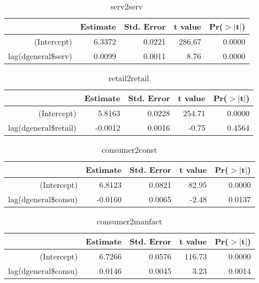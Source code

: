 \documentclass[12pt,a4paper]{report}
\begin{document}
	\begin{table}[ht]
		\centering
		\begin{tabular}{rrrrr}
			\hline
			& Estimate & Std. Error & t value & Pr($>$$|$t$|$) \\ 
			\hline
			(Intercept) & 6.3372 & 0.0221 & 286.67 & 0.0000 \\ 
			lag(dgeneral\$serv) & 0.0099 & 0.0011 & 8.76 & 0.0000 \\ 
			\hline
		\end{tabular}
		\caption{serv2serv} 
	\end{table}
	
	\begin{table}[ht]
		\centering
		\begin{tabular}{rrrrr}
			\hline
			& Estimate & Std. Error & t value & Pr($>$$|$t$|$) \\ 
			\hline
			(Intercept) & 5.8163 & 0.0228 & 254.71 & 0.0000 \\ 
			lag(dgeneral\$retail) & -0.0012 & 0.0016 & -0.75 & 0.4564 \\ 
			\hline
		\end{tabular}
		\caption{retail2retail} 
	\end{table}
	
	\begin{table}[ht]
		\centering
		\begin{tabular}{rrrrr}
			\hline
			& Estimate & Std. Error & t value & Pr($>$$|$t$|$) \\ 
			\hline
			(Intercept) & 6.8123 & 0.0821 & 82.95 & 0.0000 \\ 
			lag(dgeneral\$consu) & -0.0160 & 0.0065 & -2.48 & 0.0137 \\ 
			\hline
		\end{tabular}
		\caption{consumer2const} 
	\end{table}

	\begin{table}[ht]
		\centering
		\begin{tabular}{rrrrr}
			\hline
			& Estimate & Std. Error & t value & Pr($>$$|$t$|$) \\ 
			\hline
			(Intercept) & 6.7266 & 0.0576 & 116.73 & 0.0000 \\ 
			lag(dgeneral\$consu) & 0.0146 & 0.0045 & 3.23 & 0.0014 \\ 
			\hline
		\end{tabular}
		\caption{consumer2manfact} 
	\end{table}
	
\end{document}
